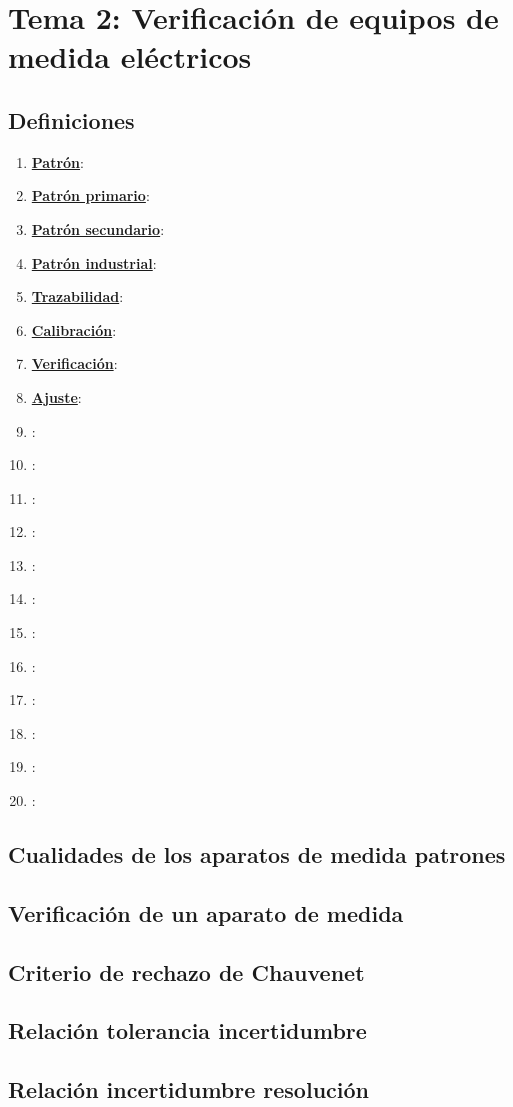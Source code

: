 \section{Tema 2: Verificación de equipos de medida eléctricos}
\subsection{Definiciones}
\begin{enumerate}
	\item \underline{\textbf{Patrón}}: 
	\item \underline{\textbf{Patrón primario}}: 
	\item \underline{\textbf{Patrón secundario}}: 
	\item \underline{\textbf{Patrón industrial}}: 
	\item \underline{\textbf{Trazabilidad}}: 
	\item \underline{\textbf{Calibración}}: 
	\item \underline{\textbf{Verificación}}: 
	\item \underline{\textbf{Ajuste}}: 
	\item \underline{\textbf{}}: 
	\item \underline{\textbf{}}: 
	\item \underline{\textbf{}}: 
	\item \underline{\textbf{}}: 
	\item \underline{\textbf{}}: 
	\item \underline{\textbf{}}: 
	\item \underline{\textbf{}}: 
	\item \underline{\textbf{}}: 
	\item \underline{\textbf{}}: 
	\item \underline{\textbf{}}: 
	\item \underline{\textbf{}}: 
	\item \underline{\textbf{}}: 
\end{enumerate}
\subsection{Cualidades de los aparatos de medida patrones}
\subsection{Verificación de un aparato de medida}
\subsection{Criterio de rechazo de Chauvenet}
\subsection{Relación tolerancia incertidumbre}
\subsection{Relación incertidumbre resolución}